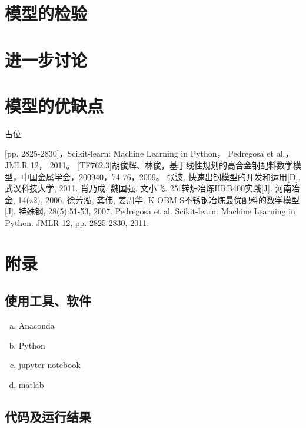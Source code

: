\documentclass{xcumcmart}
\begin{document}
\section{模型的检验}
\section{进一步讨论}
\section{模型的优缺点}
占位

\begin{thebibliography}{1}
 [pp. 2825-2830]，Scikit-learn: Machine Learning in Python， Pedregosa et al.， JMLR 12， 2011。
 [TF762.3]胡俊辉、林俊，基于线性规划的高合金钢配料数学模型，中国金属学会，200940，74-76，2009。
 张波. 快速出钢模型的开发和运用[D]. 武汉科技大学, 2011.
 肖乃成, 魏国强, 文小飞. 25t转炉冶炼HRB400实践[J]. 河南冶金, 14(z2), 2006.
 徐芳泓, 龚伟, 姜周华. K-OBM-S不锈钢冶炼最优配料的数学模型[J]. 特殊钢, 28(5):51-53, 2007.
 Pedregosa et al. Scikit-learn: Machine Learning in Python. JMLR 12, pp. 2825-2830, 2011.
\end{thebibliography}

\newpage
\section{附录}
\subsection{使用工具、软件}
\begin{enumerate}[(a)]
\item Anaconda
\item Python
\item jupyter notebook
\item matlab
\end{enumerate}
\subsection{代码及运行结果}
\end{document}
